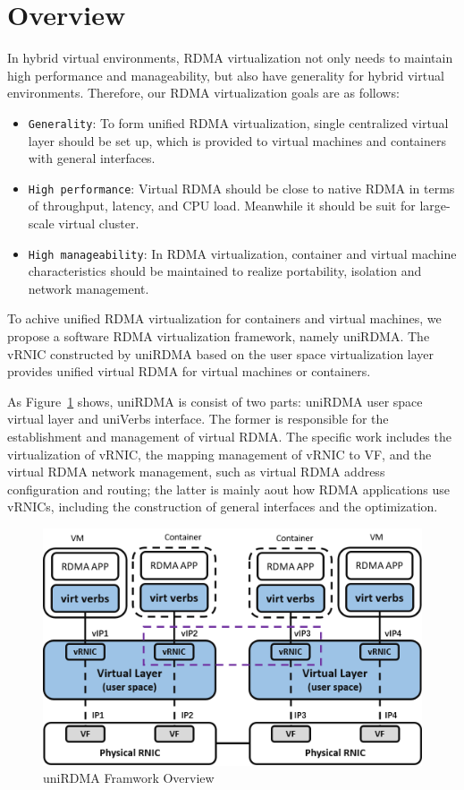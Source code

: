 \section{Overview}

In hybrid virtual environments, RDMA virtualization not only needs to maintain high performance and manageability, but also have generality for hybrid virtual environments. Therefore, our RDMA virtualization goals are as follows:

\begin{itemize}
\item {\verb|Generality|}: To form unified RDMA virtualization, single centralized virtual layer should be set up, which is provided to virtual machines and containers with general interfaces.
\item {\verb|High performance|}: Virtual RDMA should be close to native RDMA in terms of throughput, latency, and CPU load. Meanwhile it should be suit for large-scale virtual cluster.
\item {\verb|High manageability|}: In RDMA virtualization, container and virtual machine characteristics should be maintained to realize portability, isolation and network management.
\end{itemize}

To achive unified RDMA virtualization for containers and virtual machines,  we propose a software RDMA virtualization framework, namely uniRDMA. The vRNIC constructed by uniRDMA based on the user space virtualization layer provides unified virtual RDMA for virtual machines or containers.

As Figure~\ref{fig:framework-overview} shows, uniRDMA is consist of two parts: uniRDMA user space virtual layer and uniVerbs interface. The former is responsible for the establishment and management of virtual RDMA. The specific work includes the virtualization of vRNIC, the mapping management of vRNIC to VF, and the virtual RDMA network management, such as virtual RDMA address configuration and routing; the latter is mainly aout how RDMA applications use vRNICs, including the construction of general interfaces and the optimization.


\begin{figure}[!ht]
	\centering
	\includegraphics[width=1.0\linewidth]{images/framework-overview}
	\caption{uniRDMA Framwork Overview}
	\label{fig:framework-overview}
\end{figure}

